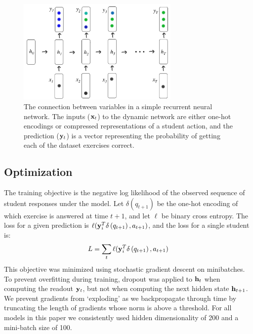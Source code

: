 \begin{figure}[t]
\begin{center}
\includegraphics[width=0.7\textwidth]{img/rnn}
\end{center}
\caption{The connection between variables in a simple recurrent neural network. The inputs ($\mathbf x_t$) to the dynamic network are either one-hot encodings or compressed representations of a student action, and the prediction ($\mathbf y_t$) is a vector representing the probability of getting each of the dataset exercises correct.
\label{fig:rnn}
}

\end{figure}

\subsection{Optimization}

The training objective is the negative log likelihood of the observed sequence of student responses under the model. Let $\delta(q_{t+1})$ be the one-hot encoding of which exercise is answered at time $t+1$, and let $\ell$ be binary cross entropy. The loss for a given prediction is $\ell(\mathbf y_i^T \mathbf \delta\left(q_{t+1}\right), a_{t+1})$, and the loss for a single student is:
 \begin{equation}
   \begin{aligned}
         L = \sum_{t}\ell(\mathbf y_i^T \mathbf \delta\left(q_{t+1}\right), a_{t+1})
   \end{aligned}
 \end{equation}
This objective was minimized using stochastic gradient descent on minibatches.
To prevent overfitting during training, dropout was applied to $\mathbf h_t$ when computing the readout $\mathbf y_t$, but not when computing the next hidden state $\mathbf h_{t+1}$.
We prevent gradients from `exploding' as we backpropagate through time by truncating the length of gradients whose norm is above a threshold. For all models in this paper we consistently used hidden dimensionality of 200 and a mini-batch size of 100. 

